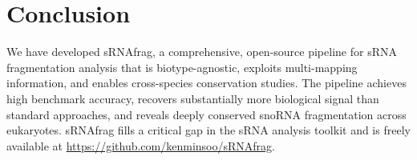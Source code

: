 \documentclass[11pt]{article}
\begin{document}
\section{Conclusion}

We have developed sRNAfrag, a comprehensive, open-source pipeline for sRNA fragmentation analysis that is biotype-agnostic, exploits multi-mapping information, and enables cross-species conservation studies. The pipeline achieves high benchmark accuracy, recovers substantially more biological signal than standard approaches, and reveals deeply conserved snoRNA fragmentation across eukaryotes. sRNAfrag fills a critical gap in the sRNA analysis toolkit and is freely available at \url{https://github.com/kenminsoo/sRNAfrag}.



\end{document}
